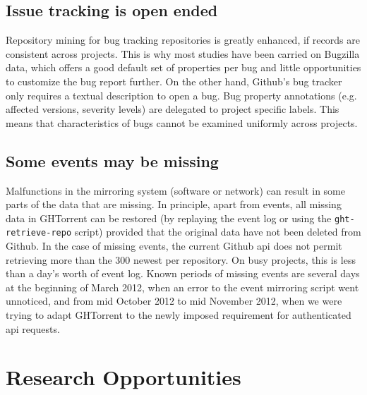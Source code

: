 \documentclass[conference]{IEEEtran}
\begin{document}
\subsection{Issue tracking is open ended} Repository mining for bug tracking
    repositories is greatly enhanced, if records are consistent across
    projects. This is why most studies have been carried on Bugzilla data, which
    offers a good default set of properties per bug and little opportunities to
    customize the bug report further. On the other hand, Github's bug tracker
    only requires a textual description to open a bug. Bug property annotations
    (e.g. affected versions, severity levels) are delegated to project specific
    labels. This means that characteristics of bugs cannot be
    examined uniformly across projects.

%
\subsection{Some events may be missing} Malfunctions in the mirroring system
    (software or network) can result in some parts of the data that are missing.
    In principle, apart from events, all missing data in GHTorrent can be
    restored (by replaying the event log or using the \texttt{ght-retrieve-repo}
    script) provided that the original data have not been deleted from Github.
    In the case of missing events, the current Github {\sc api} does not permit
    retrieving more than the 300 newest per repository. On busy projects, this
    is less than a day's worth of event log. Known periods of missing events are
    several days at the beginning of March 2012, when an error to the event
    mirroring script went unnoticed, and from mid October 2012 to mid November
    2012, when we were trying to adapt GHTorrent to the newly imposed
    requirement for authenticated {\sc api} requests.

\section{Research Opportunities}
\end{document}
